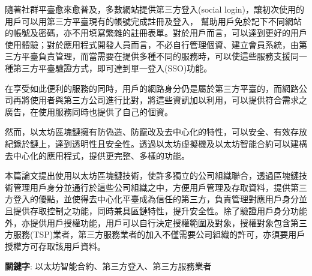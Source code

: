 \begin{abstractzh}

    隨著社群平臺愈來愈普及，多數網站提供第三方登入(social login)，讓初次使用的用戶可以用第三方平臺現有的帳號完成註冊及登入，
    幫助用戶免於記下不同網站的帳號及密碼，亦不用填寫繁雜的註冊表單。對於用戶而言，可以達到更好的用戶使用體驗；對於應用程式開發人員而言，不必自行管理個資、建立會員系統，由第三方平臺負責管理，而當需要在提供多種不同的服務時，可以使這些服務支援同一種第三方平臺驗證方式，即可達到單一登入(SSO)功能。\par
    在享受如此便利的服務的同時，用戶的網路身分仍是屬於第三方平臺的，而網路公司再將使用者與第三方公司進行比對，將這些資訊加以利用，可以提供符合需求之廣告，在使用服務同時也提供了自己的個資。\par
    然而，以太坊區塊鏈擁有防偽造、防竄改及去中心化的特性，可以安全、有效存放紀錄於鏈上，達到透明性且安全性。透過以太坊虛擬機及以太坊智能合約可以建構去中心化的應用程式，提供更完整、多樣的功能。\par
    本篇論文提出使用以太坊區塊鏈技術，使許多獨立的公司組織聯合，透過區塊鏈技術管理用戶身分並通行於這些公司組織之中，方便用戶管理及存取資料，提供第三方登入的優點，並使得去中心化平臺成為信任的第三方，負責管理對應用戶身分並且提供存取控制之功能，同時兼具區鏈特性，提升安全性。除了驗證用戶身分功能外，亦提供用戶授權功能，用戶可以自行決定授權範圍及對象，授權對象包含第三方服務(TSP)業者，第三方服務業者的加入不僅需要公司組織的許可，亦須要用戶授權方可存取該用戶資料。

\end{abstractzh}

\begin{flushleft}
    \textbf{關鍵字}: 以太坊智能合約、第三方登入、第三方服務業者
\end{flushleft}